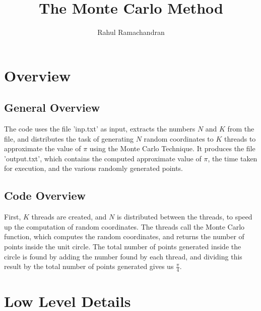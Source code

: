 \documentclass[12pt]{article}
\begin{document}
\title{
	The Monte Carlo Method
}
\author{ Rahul Ramachandran%
}

\date{\vspace{-4ex}}

\maketitle


\section{Overview}

\subsection{General Overview}
The code uses the file 'inp.txt' as input, extracts the numbers $N$ and $K$ from the file, and distributes the task of generating $N$ random coordinates to 
$K$ threads to approximate the value of $\pi$ using the Monte Carlo Technique. It produces the file 'output.txt', which contains the computed approximate value
of $\pi$, the time taken for execution, and the various randomly generated points.

\subsection{Code Overview}
First, $K$ threads are created, and $N$ is distributed between the threads, to speed up the computation of random coordinates. The threads call the 
Monte Carlo function, which computes the random coordinates, and returns the number of points inside the unit circle. The total number of points generated inside the circle
is found by adding the number found by each thread, and dividing this result by the total number of points generated gives us $\frac{\pi}{4}$.



\section{Low Level Details}
\end{document}
